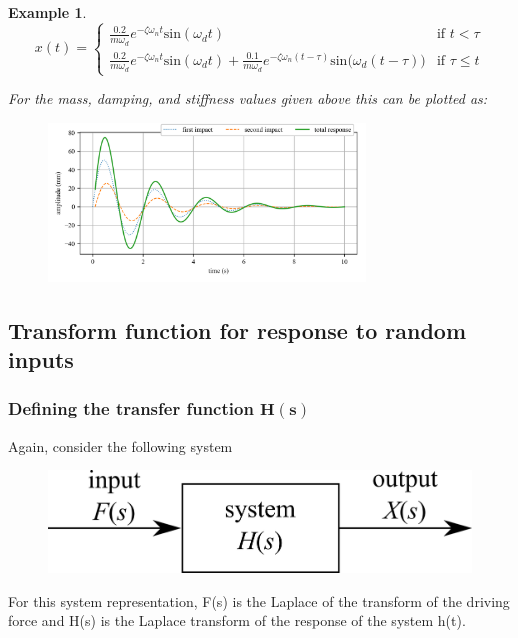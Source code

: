 \documentclass[12pt,letter]{article}
\newtheorem{ex}{Example}
\numberwithin{ex}{section} %
\newenvironment{example}{\begin{mdframed}[middlelinewidth=0.5mm]\begin{ex}\normalfont}{\end{ex}\end{mdframed}}
\numberwithin{re}{section} %
\begin{document}
\begin{example}
\[
  x(t) = 
  \begin{cases}
\frac{0.2}{m \omega_d} e^{-\zeta \omega_n t} \text{sin}(\omega_dt) & \text{if } t < \tau \\
\frac{0.2}{m \omega_d} e^{-\zeta \omega_n t} \text{sin}(\omega_dt)  + \frac{0.1}{m \omega_d} e^{-\zeta \omega_n (t-\tau)} \text{sin}\big(\omega_d(t-\tau)\big) & \text{if } \tau \leq t 
  \end{cases}
\]


For the mass, damping, and stiffness values given above this can be plotted as:
\begin{figure}[H]
	\centering
	\includegraphics[width=0.75\textwidth]{../figures/response_double_impact.png}
\end{figure}

\end{example}


\subsection{Transform function for response to random inputs}
	
\subsubsection{Defining the transfer function $\mathbf{H(s)}$}

Again, consider the following system
\begin{figure}[H]
	\centering
	\includegraphics[]{../figures/transfer_function_system.png}
\end{figure}
For this system representation, F(s) is the Laplace of the transform of the driving force and H(s) is the Laplace transform of the response of the system h(t). 
\end{document}
